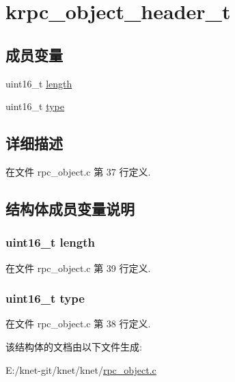 \hypertarget{structkrpc__object__header__t}{}\section{krpc\+\_\+object\+\_\+header\+\_\+t}
\label{structkrpc__object__header__t}
\subsection*{成员变量}
\begin{DoxyCompactItemize}
\item 
uint16\+\_\+t \hyperlink{structkrpc__object__header__t_a1892eba2086d12ac2b09005aeb09ea3b}{length}
\item 
uint16\+\_\+t \hyperlink{structkrpc__object__header__t_acb5cfd209ba75c853d03f701e7f91679}{type}
\end{DoxyCompactItemize}


\subsection{详细描述}


在文件 rpc\+\_\+object.\+c 第 37 行定义.



\subsection{结构体成员变量说明}
\hypertarget{structkrpc__object__header__t_a1892eba2086d12ac2b09005aeb09ea3b}{}
\subsubsection[{length}]{\setlength{\rightskip}{0pt plus 5cm}uint16\+\_\+t length}\label{structkrpc__object__header__t_a1892eba2086d12ac2b09005aeb09ea3b}


在文件 rpc\+\_\+object.\+c 第 39 行定义.

\hypertarget{structkrpc__object__header__t_acb5cfd209ba75c853d03f701e7f91679}{}
\subsubsection[{type}]{\setlength{\rightskip}{0pt plus 5cm}uint16\+\_\+t type}\label{structkrpc__object__header__t_acb5cfd209ba75c853d03f701e7f91679}


在文件 rpc\+\_\+object.\+c 第 38 行定义.



该结构体的文档由以下文件生成\+:\begin{DoxyCompactItemize}
\item 
E\+:/knet-\/git/knet/knet/\hyperlink{rpc__object_8c}{rpc\+\_\+object.\+c}\end{DoxyCompactItemize}
